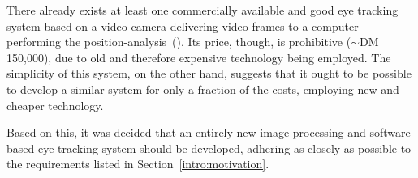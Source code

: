 There already exists at least one commercially available and good eye
tracking system based on a video camera delivering video frames to a
computer performing the position-analysis~(\cite{antrag}).  Its price,
though, is prohibitive ($\sim$DM 150,000), due to old and therefore
expensive technology being employed.  The simplicity of this system,
on the other hand, suggests that it ought to be possible to develop a
similar system for only a fraction of the costs, employing new and
cheaper technology.

Based on this, it was decided that an entirely new image processing
and software based eye tracking system should be developed, adhering
as closely as possible to the requirements listed in
Section~\ref{intro:motivation}. 
